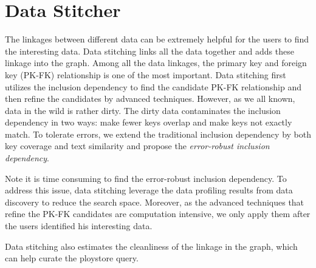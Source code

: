 \section{Data Stitcher}
\label{sec:stitching}

\newcommand{\eind}{error-robust inclusion dependency\xspace}
\newcommand{\ind}{inclusion dependency\xspace}
\newcommand{\R}{\ensuremath{R}\xspace}
\renewcommand{\S}{\ensuremath{S}\xspace}
\newcommand{\X}{\ensuremath{X}\xspace}
\newcommand{\Y}{\ensuremath{Y}\xspace}
\newcommand{\RX}{\ensuremath{\R[\X]}\xspace}
\newcommand{\SY}{\ensuremath{\S[\Y]}\xspace}
\newcommand{\IND}{IND\ensuremath{(\X,\Y)}\xspace}
\newcommand{\EIND}{\texttt{EIND}\ensuremath{(\RX,\SY)}\xspace}
\newcommand\subsetsim{\mathrel{%
  \ooalign{\raise0.3ex\hbox{$\subset$}\cr\hidewidth\raise-0.6ex\hbox{\scalebox{0.8}{$\sim$}}\hidewidth\cr}}}
\newcommand{\G}{\ensuremath{G}\xspace}
\newcommand{\E}{\ensuremath{E}\xspace}
\newcommand{\U}{\ensuremath{U}\xspace}
\newcommand{\V}{\ensuremath{V}\xspace}

\newtheorem{theorem}{Theorem}
\newtheorem{example}{Example}
\newtheorem{definition}{Definition}
\newtheorem{proposition}{Proposition}
\newtheorem{lemma}{Lemma}
\newtheorem{corollary}{Corollary}




The linkages between different data can be extremely helpful for the users to find the interesting data. Data stitching links all the data together and adds these linkage into the graph. Among all the data linkages, the primary key and foreign key (PK-FK) relationship is one of the most important. Data stitching first utilizes the inclusion dependency to find the candidate PK-FK relationship and then refine the candidates by advanced techniques. However, as we all known, data in the wild is rather dirty. The dirty data contaminates the inclusion dependency in two ways: make fewer keys overlap and make keys not exactly match. To tolerate errors, we extend the traditional inclusion dependency by both key coverage and text similarity and propose the \emph{\eind}. 

Note it is time consuming to find the \eind. To address this issue, data stitching leverage the data profiling results from data discovery to reduce the search space. Moreover, as the advanced techniques that refine the PK-FK candidates are computation intensive, we only apply them after the users identified his interesting data.

Data stitching also estimates the cleanliness of the linkage in the graph, which can help curate the ploystore query.


